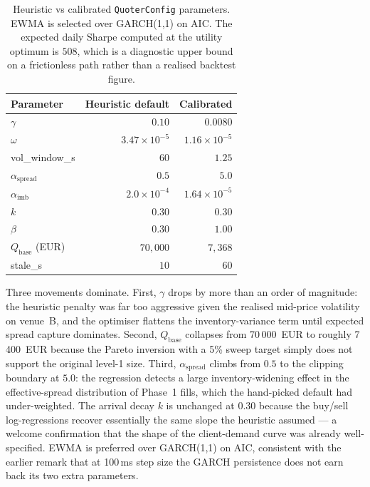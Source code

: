 \begin{table}[ht]
\centering
\begin{tabular}{lrr}
\toprule
Parameter & Heuristic default & Calibrated \\
\midrule
$\gamma$                      & $0.10$        & $0.0080$ \\
$\omega$                      & $3.47\!\times\!10^{-5}$ & $1.16\!\times\!10^{-5}$ \\
vol\_window\_s                & $60$          & $1.25$ \\
$\alpha_{\text{spread}}$      & $0.5$         & $5.0$ \\
$\alpha_{\text{imb}}$         & $2.0\!\times\!10^{-4}$ & $1.64\!\times\!10^{-5}$ \\
$k$                           & $0.30$        & $0.30$ \\
$\beta$                       & $0.30$        & $1.00$ \\
$Q_{\text{base}}$ (EUR)       & $70{,}000$    & $7{,}368$ \\
stale\_s                      & $10$          & $60$ \\
\bottomrule
\end{tabular}
\caption{Heuristic vs calibrated \texttt{QuoterConfig} parameters.
EWMA is selected over GARCH(1,1) on AIC. The expected daily Sharpe
computed at the utility optimum is $508$, which is a diagnostic upper
bound on a frictionless path rather than a realised backtest figure.}
\label{tab:p2-calibrated}
\end{table}

Three movements dominate. First, $\gamma$ drops by more than an order
of magnitude: the heuristic penalty was far too aggressive given the
realised mid-price volatility on venue~B, and the optimiser flattens
the inventory-variance term until expected spread capture dominates.
Second, $Q_{\text{base}}$ collapses from 70\,000~EUR to roughly
7\,400~EUR because the Pareto inversion with a 5\% sweep target
simply does not support the original level-1 size. Third,
$\alpha_{\text{spread}}$ climbs from $0.5$ to the clipping boundary
at $5.0$: the regression detects a large inventory-widening effect
in the effective-spread distribution of Phase~1 fills, which the
hand-picked default had under-weighted. The arrival decay $k$ is
unchanged at $0.30$ because the buy/sell log-regressions recover
essentially the same slope the heuristic assumed --- a welcome
confirmation that the shape of the client-demand curve was already
well-specified. EWMA is preferred over GARCH(1,1) on AIC, consistent
with the earlier remark that at 100\,ms step size the GARCH
persistence does not earn back its two extra parameters.

